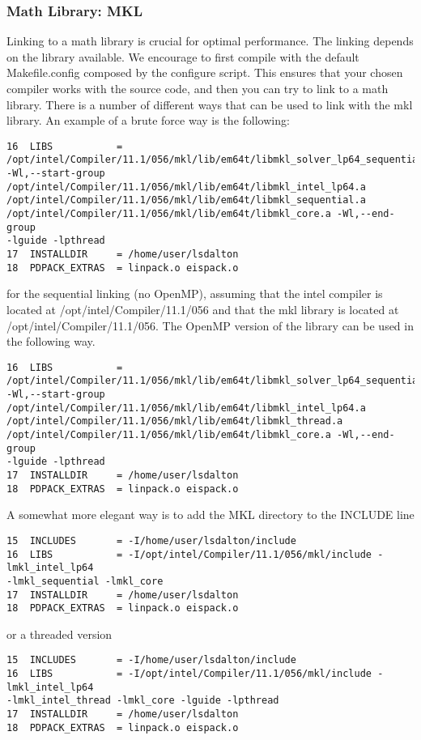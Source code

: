 \subsubsection{Math Library: MKL}\label{mkl:ifort}
Linking to a math library is crucial for optimal performance. The linking 
depends on the library available. We encourage to first compile with the 
default Makefile.config composed by the configure script. This ensures that 
your chosen compiler works with the {\lsdalton} source code,
and then you can try to link to a math library.
There is a number of different ways that can be used to 
link {\lsdalton} with the mkl library.
An example of a brute force way is the following:
\begin{verbatim}
16  LIBS           = 
/opt/intel/Compiler/11.1/056/mkl/lib/em64t/libmkl_solver_lp64_sequential.a 
-Wl,--start-group /opt/intel/Compiler/11.1/056/mkl/lib/em64t/libmkl_intel_lp64.a 
/opt/intel/Compiler/11.1/056/mkl/lib/em64t/libmkl_sequential.a 
/opt/intel/Compiler/11.1/056/mkl/lib/em64t/libmkl_core.a -Wl,--end-group 
-lguide -lpthread
17  INSTALLDIR     = /home/user/lsdalton
18  PDPACK_EXTRAS  = linpack.o eispack.o
\end{verbatim}
for the sequential linking (no OpenMP), assuming that the intel compiler is 
located at /opt/intel/Compiler/11.1/056 and that the mkl library is located 
at /opt/intel/Compiler/11.1/056.
The OpenMP version of the library can be used in the following way.
\begin{verbatim}
16  LIBS           = 
/opt/intel/Compiler/11.1/056/mkl/lib/em64t/libmkl_solver_lp64_sequential.a 
-Wl,--start-group /opt/intel/Compiler/11.1/056/mkl/lib/em64t/libmkl_intel_lp64.a 
/opt/intel/Compiler/11.1/056/mkl/lib/em64t/libmkl_thread.a 
/opt/intel/Compiler/11.1/056/mkl/lib/em64t/libmkl_core.a -Wl,--end-group 
-lguide -lpthread
17  INSTALLDIR     = /home/user/lsdalton
18  PDPACK_EXTRAS  = linpack.o eispack.o
\end{verbatim}
A somewhat more elegant way is to add the MKL directory to the INCLUDE line 
\begin{verbatim}
15  INCLUDES       = -I/home/user/lsdalton/include
16  LIBS           = -I/opt/intel/Compiler/11.1/056/mkl/include -lmkl_intel_lp64 
-lmkl_sequential -lmkl_core
17  INSTALLDIR     = /home/user/lsdalton
18  PDPACK_EXTRAS  = linpack.o eispack.o
\end{verbatim}
or a threaded version
\begin{verbatim}
15  INCLUDES       = -I/home/user/lsdalton/include
16  LIBS           = -I/opt/intel/Compiler/11.1/056/mkl/include -lmkl_intel_lp64 
-lmkl_intel_thread -lmkl_core -lguide -lpthread
17  INSTALLDIR     = /home/user/lsdalton
18  PDPACK_EXTRAS  = linpack.o eispack.o
\end{verbatim}

